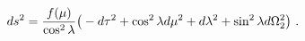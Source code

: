 \begin{equation}
ds^2 = {f(\mu)\over\cos^2\lambda} 
 \big( -d\tau^2 + \cos^2\lambda d\mu^2 + 
  d\lambda^2 +\sin^2\lambda d\Omega_2^2\big)\ .
\label{geo}
\end{equation}

